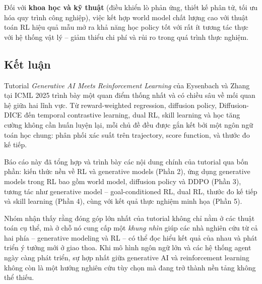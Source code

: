 Đối với \textbf{khoa học và kỹ thuật} (điều khiển lò phản ứng, thiết kế phân tử, tối ưu hóa
quy trình công nghiệp), việc kết hợp world model chất lượng cao với thuật toán RL hiệu quả mẫu
mở ra khả năng học policy tốt với rất ít tương tác thực với hệ thống vật lý -- giảm thiểu
chi phí và rủi ro trong quá trình thực nghiệm.

\subsection{Kết luận}

Tutorial \textit{Generative AI Meets Reinforcement Learning} của Eysenbach và Zhang tại ICML 2025
trình bày một quan điểm thống nhất và có chiều sâu về mối quan hệ giữa hai lĩnh vực.
Từ reward-weighted regression, diffusion policy, Diffusion-DICE đến temporal contrastive learning,
dual RL, skill learning và học tăng cường không cần huấn luyện lại, mỗi chủ đề đều được gắn kết bởi một ngôn ngữ toán học
chung: phân phối xác suất trên trajectory, score function, và thước đo kế tiếp.

Báo cáo này đã tổng hợp và trình bày các nội dung chính của tutorial qua bốn phần:
kiến thức nền về RL và generative models (Phần 2),
ứng dụng generative models trong RL bao gồm world model, diffusion policy và DDPO (Phần 3),
tương tác như generative model -- goal-conditioned RL, dual RL, thước đo kế tiếp và skill learning (Phần 4),
cùng với kết quả thực nghiệm minh họa (Phần 5).

Nhóm nhận thấy rằng đóng góp lớn nhất của tutorial không chỉ nằm ở các thuật toán cụ thể,
mà ở chỗ nó cung cấp một \textit{khung nhìn} giúp các nhà nghiên cứu từ cả hai phía --
generative modeling và RL -- có thể đọc hiểu kết quả của nhau và phát triển ý tưởng mới ở giao thoa.
Khi mô hình ngôn ngữ lớn và các hệ thống agent ngày càng phát triển,
sự hợp nhất giữa generative AI và reinforcement learning không còn là một
hướng nghiên cứu tùy chọn mà đang trở thành nền tảng không thể thiếu.

